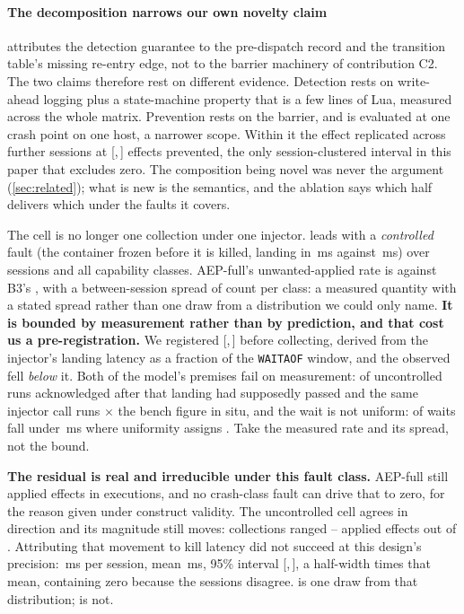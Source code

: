 \paragraph{The decomposition narrows our own novelty claim}
 attributes the detection guarantee to the pre-dispatch
record and the transition table's missing re-entry edge, not to the barrier
machinery of contribution C2. The two claims therefore rest on different
evidence. Detection rests on write-ahead logging plus a state-machine property
that is a few lines of Lua, measured across the whole matrix. Prevention rests
on the barrier, and is evaluated at one crash point on one host, a narrower
scope. Within it the effect replicated across \ReplicationSessions{}
further sessions at
[\ReplicationPreventedLow{},\,\ReplicationPreventedHigh{}] effects prevented,
the only session-clustered interval in this paper that excludes zero. The
composition being novel was never the argument (\cref{sec:related}); what is new
is the semantics, and the ablation says which half delivers which under the
faults it covers.

The cell is no longer one collection under one injector.
 leads with a \emph{controlled} fault (the
container frozen before it is killed, landing in \ControlledLanding{}\,ms
against \UncontrolledLanding{}\,ms) over \ArmASessions{} sessions and all
\ArmAClasses{} capability classes. AEP-full's unwanted-applied rate is
\ArmAAepRate{} against B3's \ArmABthreeRate{}, with a between-session spread of
\ArmASpreadMax{} count per class: a measured quantity with a stated spread
rather than one draw from a distribution we could only name. \textbf{It is
bounded by measurement rather than by prediction, and that cost us a
pre-registration.} We registered [\ArmABoundLow{},\,\ArmABoundHigh{}] before
collecting, derived from the injector's landing latency as a fraction of the
\texttt{WAITAOF} window, and the observed \ArmAAepRate{} fell \emph{below} it.
Both of the model's premises fail on measurement: \ModelAcksPastLanding{} of
\ModelAckN{} uncontrolled runs acknowledged after that landing had supposedly
passed and the same injector call runs \ModelInSituRatio{}$\times$ the bench
figure in situ, and the wait is not uniform: \ModelEmpiricalWindow{} of waits
fall under \ControlledLanding{}\,ms where uniformity assigns
\ModelUniformWindow{}. Take the measured rate and its spread, not the bound.

\textbf{The residual is real and irreducible under this fault class.} AEP-full
still applied \ArmAAepApplied{} effects in \ArmAAepN{} executions, and no
crash-class fault can drive that to zero, for the reason given under construct
validity. The uncontrolled cell agrees in direction and its magnitude still
moves: \ReplicationSessions{} collections ranged
\ReplicationAepMin{}--\ReplicationAepMax{} applied effects out of
\AepKillRuns{}. Attributing that movement to kill latency did not succeed at
this design's precision: \KillLatencyPerSession{}\,ms per session, mean
\KillLatencyMean{}\,ms, 95\% interval
[\KillLatencyLow{},\,\KillLatencyHigh{}], a half-width
\KillLatencyPrecisionRatio{} times that mean, containing zero because the
sessions disagree. \UnwantedPrevented{} is one draw from that distribution;
\ArmAAepRate{} is not.

